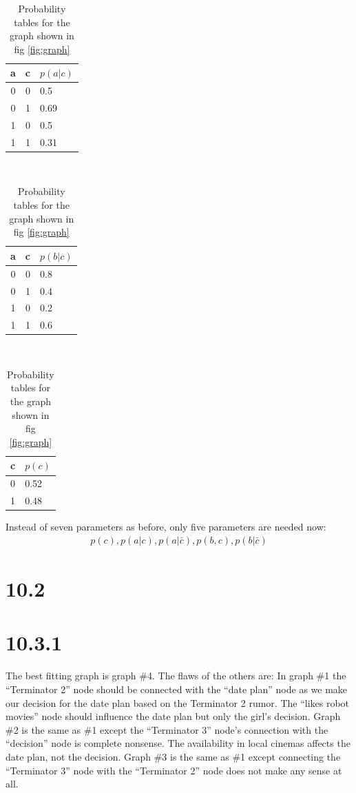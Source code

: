 \documentclass[a4paper,11pt]{article}
\theoremstyle{definition}
\theoremstyle{plain}
\theoremstyle{remark}
\begin{document}
\begin{table}
\centering
\caption{Probability tables for the graph shown in fig \ref{fig:graph}}
\begin{tabular}{|c|c|l|}
\hline
a & c & $p(a|c)$ \\ \hline
0 & 0 & 0.5 \\ \hline
0 & 1 & 0.69 \\ \hline
1 & 0 & 0.5 \\ \hline
1 & 1 & 0.31 \\ \hline
\end{tabular}
~
\begin{tabular}{|c|c|l|}
\hline
a & c & $p(b|c)$ \\ \hline
0 & 0 & 0.8 \\ \hline
0 & 1 & 0.4 \\ \hline
1 & 0 & 0.2 \\ \hline
1 & 1 & 0.6 \\ \hline
\end{tabular}
~
\begin{tabular}{|c|l|}
\hline
c & $p(c)$ \\ \hline
0 & 0.52 \\ \hline
1 & 0.48 \\ \hline
\end{tabular}
\end{table}
Instead of seven parameters as before, only five parameters are needed now:
\begin{align}
p(c), p(a|c), p(a|\bar{c}), p(b,c), p(b|\bar{c})
\end{align}

\section*{10.2}


\section*{10.3.1}
The best fitting graph is graph \#4. The flaws of the others are:
In graph \#1 the ``Terminator 2'' node should be connected with the ``date plan'' node as we make our decision for the date plan based on the Terminator 2 rumor. The ``likes robot movies'' node should influence the date plan but only the girl's decision. Graph \#2 is the same as \#1 except the ``Terminator 3'' node's connection with the ``decision'' node is complete nonsense. The availability in local cinemas affects the date plan, not the decision. Graph \#3 is the same as \#1 except connecting the ``Terminator 3'' node with the ``Terminator 2'' node does not make any sense at all.
\end{document}
